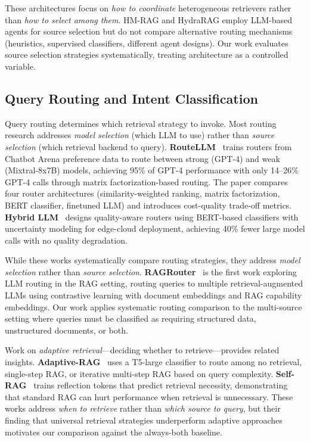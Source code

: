 \documentclass[twocolumn,10pt]{article}
\begin{document}
These architectures focus on \emph{how to coordinate} heterogeneous retrievers rather than \emph{how to select among them}. HM-RAG and HydraRAG employ LLM-based agents for source selection but do not compare alternative routing mechanisms (heuristics, supervised classifiers, different agent designs). Our work evaluates source selection strategies systematically, treating architecture as a controlled variable.

\subsection{Query Routing and Intent Classification}

Query routing determines which retrieval strategy to invoke. Most routing research addresses \emph{model selection} (which LLM to use) rather than \emph{source selection} (which retrieval backend to query). \textbf{RouteLLM}~\cite{routellm} trains routers from Chatbot Arena preference data to route between strong (GPT-4) and weak (Mixtral-8x7B) models, achieving 95\% of GPT-4 performance with only 14--26\% GPT-4 calls through matrix factorization-based routing. The paper compares four router architectures (similarity-weighted ranking, matrix factorization, BERT classifier, finetuned LLM) and introduces cost-quality trade-off metrics. \textbf{Hybrid LLM}~\cite{hybridllm} designs quality-aware routers using BERT-based classifiers with uncertainty modeling for edge-cloud deployment, achieving 40\% fewer large model calls with no quality degradation.

While these works systematically compare routing strategies, they address \emph{model selection} rather than \emph{source selection}. \textbf{RAGRouter}~\cite{ragrouter} is the first work exploring LLM routing in the RAG setting, routing queries to multiple retrieval-augmented LLMs using contrastive learning with document embeddings and RAG capability embeddings. Our work applies systematic routing comparison to the multi-source setting where queries must be classified as requiring structured data, unstructured documents, or both.

Work on \emph{adaptive retrieval}---deciding whether to retrieve---provides related insights. \textbf{Adaptive-RAG}~\cite{adaptiverag} uses a T5-large classifier to route among no retrieval, single-step RAG, or iterative multi-step RAG based on query complexity. \textbf{Self-RAG}~\cite{selfrag} trains reflection tokens that predict retrieval necessity, demonstrating that standard RAG can hurt performance when retrieval is unnecessary. These works address \emph{when to retrieve} rather than \emph{which source to query}, but their finding that universal retrieval strategies underperform adaptive approaches motivates our comparison against the always-both baseline.
\end{document}
